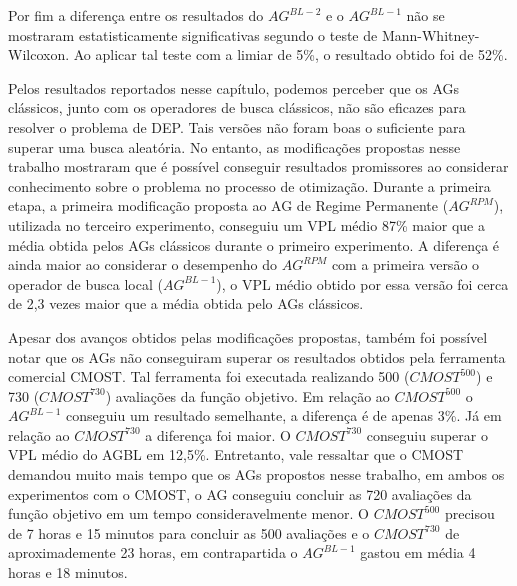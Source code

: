 Por fim a diferença entre os resultados do $AG^{BL-2}$ e o $AG^{BL-1}$ não se mostraram estatisticamente significativas segundo o teste de Mann-Whitney-Wilcoxon. Ao aplicar tal teste com a limiar de 5\%, o resultado obtido foi de 52\%.
\newline
\par
Pelos resultados reportados nesse capítulo, podemos perceber que os AGs clássicos, junto com os operadores de busca clássicos, não são eficazes para resolver o problema de DEP. Tais versões não foram boas o suficiente para superar uma busca aleatória.  No entanto, as modificações propostas nesse trabalho mostraram que é possível conseguir resultados promissores ao considerar conhecimento sobre o problema no processo de otimização. Durante a primeira etapa, a primeira modificação proposta ao AG de Regime Permanente ($AG^{RPM}$), utilizada no terceiro experimento, conseguiu um VPL médio 87\% maior que a média obtida pelos AGs clássicos durante o primeiro experimento. A diferença é ainda maior ao considerar o desempenho do $AG^{RPM}$ com a primeira versão o operador de busca local ($AG^{BL-1}$), o VPL médio obtido por essa versão foi cerca de 2,3 vezes maior que a média obtida pelo AGs clássicos.

Apesar dos avanços obtidos pelas modificações propostas, também foi possível notar que os AGs não conseguiram superar os resultados obtidos pela ferramenta comercial CMOST. Tal ferramenta foi executada realizando 500 ($CMOST^{500}$) e 730 ($CMOST^{730}$) avaliações da função objetivo. Em relação ao $CMOST^{500}$  o $AG^{BL-1}$ conseguiu um resultado semelhante, a diferença é de apenas 3\%. Já em relação ao $CMOST^{730}$ a diferença foi maior. O $CMOST^{730}$ conseguiu superar o VPL médio do AGBL em 12,5\%. Entretanto, vale ressaltar que o CMOST demandou muito mais tempo que os AGs propostos nesse trabalho, em ambos os experimentos com o CMOST, o AG conseguiu concluir as 720 avaliações da função objetivo em um tempo consideravelmente menor. O $CMOST^{500}$ precisou de 7 horas e 15 minutos para concluir as 500 avaliações e o $CMOST^{730}$ de aproximademente 23 horas, em contrapartida o $AG^{BL-1}$ gastou em média 4 horas e 18 minutos.